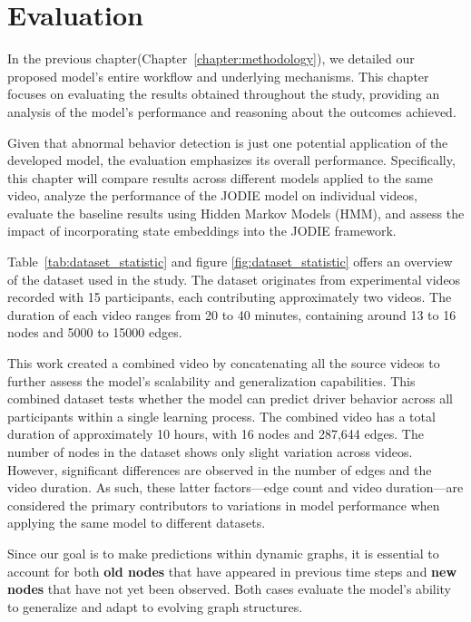 \chapter{Evaluation}\label{chapter:evaluation}

In the previous chapter(Chapter~\ref{chapter:methodology}), we detailed our proposed model's entire workflow and underlying mechanisms. This chapter focuses on evaluating the results obtained throughout the study, providing an analysis of the model's performance and reasoning about the outcomes achieved.

Given that abnormal behavior detection is just one potential application of the developed model, the evaluation emphasizes its overall performance. Specifically, this chapter will compare results across different models applied to the same video, analyze the performance of the JODIE model on individual videos, evaluate the baseline results using Hidden Markov Models (HMM), and assess the impact of incorporating state embeddings into the JODIE framework.

Table~\ref{tab:dataset_statistic} and figure \ref{fig:dataset_statistic} offers an overview of the dataset used in the study. The dataset originates from experimental videos recorded with 15 participants, each contributing approximately two videos. The duration of each video ranges from 20 to 40 minutes, containing around 13 to 16 nodes and 5000 to 15000 edges.

This work created a combined video by concatenating all the source videos to further assess the model's scalability and generalization capabilities. This combined dataset tests whether the model can predict driver behavior across all participants within a single learning process. The combined video has a total duration of approximately 10 hours, with 16 nodes and 287,644 edges. The number of nodes in the dataset shows only slight variation across videos. However, significant differences are observed in the number of edges and the video duration. As such, these latter factors—edge count and video duration—are considered the primary contributors to variations in model performance when applying the same model to different datasets.

Since our goal is to make predictions within dynamic graphs, it is essential to account for both \textbf{old nodes} that have appeared in previous time steps and \textbf{new nodes} that have not yet been observed. Both cases evaluate the model’s ability to generalize and adapt to evolving graph structures.

